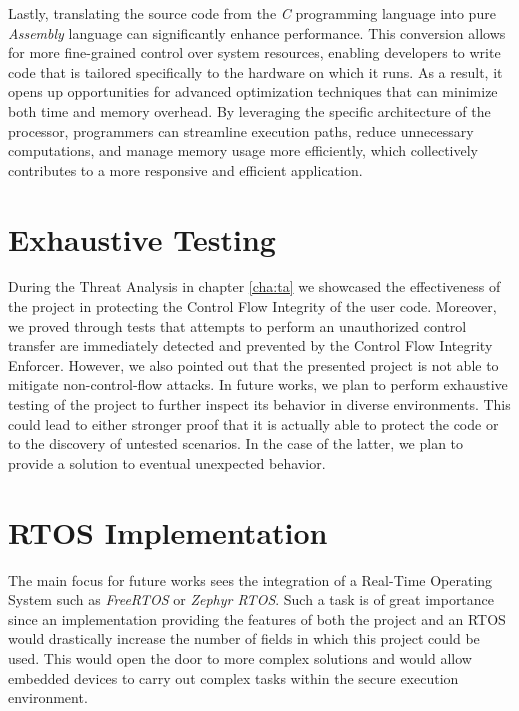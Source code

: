 Lastly, translating the source code from the \textit{C} programming language into
pure \textit{Assembly} language can significantly enhance performance. This conversion
allows for more fine-grained control over system resources, enabling developers
to write code that is tailored specifically to the hardware on which it runs. As
a result, it opens up opportunities for advanced optimization techniques that
can minimize both time and memory overhead. By leveraging the specific architecture
of the processor, programmers can streamline execution paths, reduce unnecessary
computations, and manage memory usage more efficiently, which collectively contributes
to a more responsive and efficient application.

\section{Exhaustive Testing}
\label{sec:future_testing}

During the Threat Analysis in chapter \ref{cha:ta} we showcased the
effectiveness of the project in protecting the Control Flow Integrity of the
user code. Moreover, we proved through tests that attempts to perform an
unauthorized control transfer are immediately detected and prevented by the
Control Flow Integrity Enforcer. However, we also pointed out that the presented
project is not able to mitigate non-control-flow attacks. In future works, we
plan to perform exhaustive testing of the project to further inspect its
behavior in diverse environments. This could lead to either stronger proof that it
is actually able to protect the code or to the discovery of untested scenarios.
In the case of the latter, we plan to provide a solution to eventual unexpected behavior.

\section{RTOS Implementation}
\label{sec:future_rtos}

The main focus for future works sees the integration of a Real-Time Operating
System such as \textit{FreeRTOS} or \textit{Zephyr RTOS}. Such a task is of great
importance since an implementation providing the features of both the project and
an RTOS would drastically increase the number of fields in which this project could
be used. This would open the door to more complex solutions and would allow
embedded devices to carry out complex tasks within the secure execution
environment.

